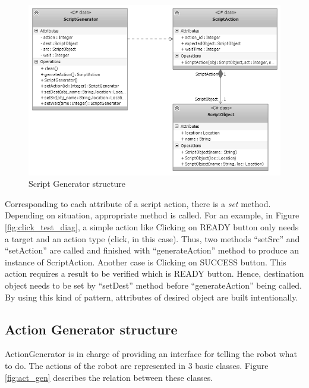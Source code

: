 	\begin{figure}[H]
		\centering
		\includegraphics[scale=0.75]{Chapters/Fig/script_gen.png}
		\caption{Script Generator structure}
		\label{fig:script_gen}
	\end{figure}

Corresponding to each attribute of a script action, there is a \textit{set} method. Depending on situation, appropriate method is called. For an example, in Figure \ref{fig:click_test_diag}, a simple action like Clicking on READY button only needs a target and an action type (click, in this case). Thus, two methods ``setSrc'' and ``setAction'' are called and finished with ``generateAction'' method to produce an instance of ScriptAction. Another case is Clicking on SUCCESS button. This action requires a result to be verified which is READY button. Hence, destination object needs to be set by ``setDest'' method before ``generateAction'' being called. By using this kind of pattern, attributes of desired object are built intentionally.

\subsection{Action Generator structure}
ActionGenerator is in charge of providing an interface for telling the robot what to do. The actions of the robot are represented in 3 basic classes. Figure \ref{fig:act_gen} describes the relation between these classes.


